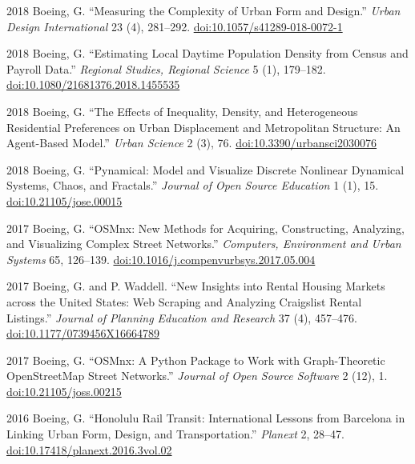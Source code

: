 \documentclass[12pt,letterpaper]{report}
\begin{document}
\begin{tablist}
        \item[2018] \tab Boeing, G. \enquote{Measuring the Complexity of Urban Form and Design.} \textit{Urban Design International} 23 (4), 281--292. \href{https://doi.org/10.1057/s41289-018-0072-1}{doi:10.1057/s41289-018-0072-1}

        \item[2018] \tab Boeing, G. \enquote{Estimating Local Daytime Population Density from Census and Payroll Data.} \textit{Regional Studies, Regional Science} 5 (1), 179--182. \href{https://doi.org/10.1080/21681376.2018.1455535}{doi:10.1080/21681376.2018.1455535}

        \item[2018] \tab Boeing, G. \enquote{The Effects of Inequality, Density, and Heterogeneous Residential Preferences on Urban Displacement and Metropolitan Structure: An Agent-Based Model.} \textit{Urban Science} 2 (3), 76. \href{https://doi.org/10.3390/urbansci2030076}{doi:10.3390/urbansci2030076}

        \item[2018] \tab Boeing, G. \enquote{Pynamical: Model and Visualize Discrete Nonlinear Dynamical Systems, Chaos, and Fractals.} \textit{Journal of Open Source Education} 1 (1), 15. \href{https://doi.org/10.21105/jose.00015}{doi:10.21105/jose.00015}

        \item[2017] \tab Boeing, G. \enquote{OSMnx: New Methods for Acquiring, Constructing, Analyzing, and Visualizing Complex Street Networks.} \textit{Computers, Environment and Urban Systems} 65, 126--139. \href{https://doi.org/10.1016/j.compenvurbsys.2017.05.004}{doi:10.1016/j.compenvurbsys.2017.05.004}

        \item[2017] \tab Boeing, G. and P. Waddell. \enquote{New Insights into Rental Housing Markets across the United States: Web Scraping and Analyzing Craigslist Rental Listings.} \textit{Journal of Planning Education and Research} 37 (4), 457--476. \href{https://doi.org/10.1177/0739456X16664789}{doi:10.1177/0739456X16664789}

        \item[2017] \tab Boeing, G. \enquote{OSMnx: A Python Package to Work with Graph-Theoretic OpenStreetMap Street Networks.} \textit{Journal of Open Source Software} 2 (12), 1. \href{https://doi.org/10.21105/joss.00215}{doi:10.21105/joss.00215}

        \item[2016] \tab Boeing, G. \enquote{Honolulu Rail Transit: International Lessons from Barcelona in Linking Urban Form, Design, and Transportation.} \textit{Planext} 2, 28--47. \href{https://doi.org/10.17418/planext.2016.3vol.02}{doi:10.17418/planext.2016.3vol.02}


\end{tablist}
\end{document}
